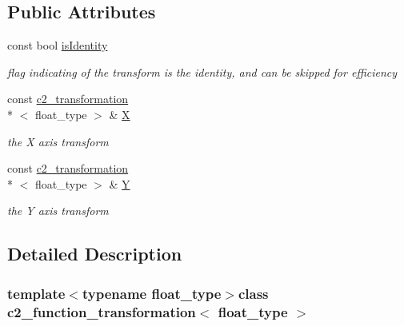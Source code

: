 \subsection*{Public Attributes}
\begin{DoxyCompactItemize}
\item 
\hypertarget{classc2__function__transformation_ad6c579898f034cf8357d773ec87164a4}{const bool \hyperlink{classc2__function__transformation_ad6c579898f034cf8357d773ec87164a4}{is\-Identity}}\label{classc2__function__transformation_ad6c579898f034cf8357d773ec87164a4}

\begin{DoxyCompactList}\small\item\em flag indicating of the transform is the identity, and can be skipped for efficiency \end{DoxyCompactList}\item 
\hypertarget{classc2__function__transformation_a2bd1bd477972e8df3ed0e6d641940e92}{const \hyperlink{classc2__transformation}{c2\-\_\-transformation}\\*
$<$ float\-\_\-type $>$ \& \hyperlink{classc2__function__transformation_a2bd1bd477972e8df3ed0e6d641940e92}{X}}\label{classc2__function__transformation_a2bd1bd477972e8df3ed0e6d641940e92}

\begin{DoxyCompactList}\small\item\em the X axis transform \end{DoxyCompactList}\item 
\hypertarget{classc2__function__transformation_a867523e0adfac76943984aa5a26d4274}{const \hyperlink{classc2__transformation}{c2\-\_\-transformation}\\*
$<$ float\-\_\-type $>$ \& \hyperlink{classc2__function__transformation_a867523e0adfac76943984aa5a26d4274}{Y}}\label{classc2__function__transformation_a867523e0adfac76943984aa5a26d4274}

\begin{DoxyCompactList}\small\item\em the Y axis transform \end{DoxyCompactList}\end{DoxyCompactItemize}


\subsection{Detailed Description}
\subsubsection*{template$<$typename float\-\_\-type$>$class c2\-\_\-function\-\_\-transformation$<$ float\-\_\-type $>$}

